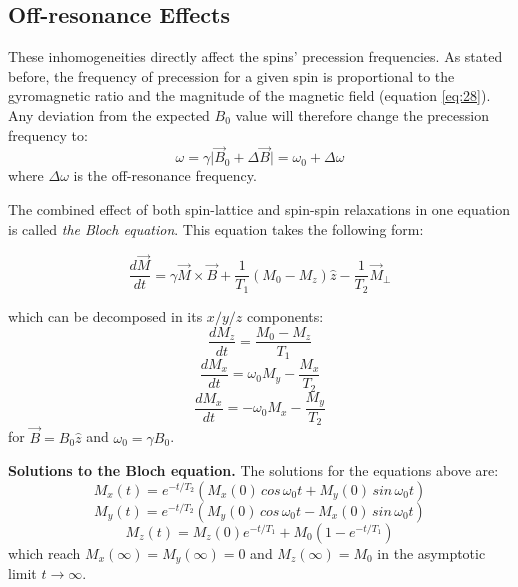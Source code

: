 \hfill

\subsection{Off-resonance Effects}

These inhomogeneities directly affect the spins' precession frequencies.
As stated before, the frequency of precession for a given spin is proportional to the gyromagnetic ratio and the magnitude of the magnetic field (equation \ref{eq:28}).
Any deviation from the expected $B_0$ value will therefore change the precession frequency to:
\begin{equation}
    \omega = \gamma \lvert \vec{B}_0 + \Delta \vec{B} \rvert = \omega_0 + \Delta \omega
\end{equation}
where $\Delta \omega$ is the off-resonance frequency.

\hfill

\label{chapterlabel2sec1Bloch}

The combined effect of both spin-lattice and spin-spin relaxations in one equation is called \textit{the Bloch equation}. 
This equation takes the following form:

\begin{equation} \label{eq:421}
    \frac{d\vec{M}}{dt} = \gamma \vec{M} \times \vec{B} + \frac{1}{T_1} (M_0 - M_z) \hat{z} - \frac{1}{T_2} \vec{M}_{\perp}
\end{equation} 

which can be decomposed in its $x/y/z$ components:
\begin{equation} \label{eq:422}
    \frac{dM_z}{dt} = \frac{M_0 - M_z}{T_1}
\end{equation}
\begin{equation} \label{eq:423}
    \frac{dM_x}{dt} = \omega_0 M_y - \frac{M_x}{T_2}
\end{equation}
\begin{equation} \label{eq:424}
    \frac{dM_x}{dt} = -\omega_0 M_x - \frac{M_y}{T_2}
\end{equation}
for $\vec{B} = B_0 \hat{z}$ and $\omega_0 = \gamma B_0$.

\hfill

\textbf{Solutions to the Bloch equation.} 
The solutions for the equations above are:
\begin{equation} \label{eq:425}
    M_x(t) = e^{-t/T_2} (M_x(0) \, cos \, \omega_0 t + M_y(0) \, sin \, \omega_0 t)
\end{equation}
\begin{equation} \label{eq:426}
    M_y(t) = e^{-t/T_2} (M_y(0) \, cos \, \omega_0 t - M_x(0) \, sin \, \omega_0 t)
\end{equation}
\begin{equation} \label{eq:427}
    M_z(t) = M_z(0) e^{-t/T_1} + M_0 (1 - e^{-t/T_1})
\end{equation}
which reach $M_x(\infty) = M_y(\infty) = 0$ and $M_z(\infty) = M_0$ in the asymptotic limit $t \rightarrow \infty$.

